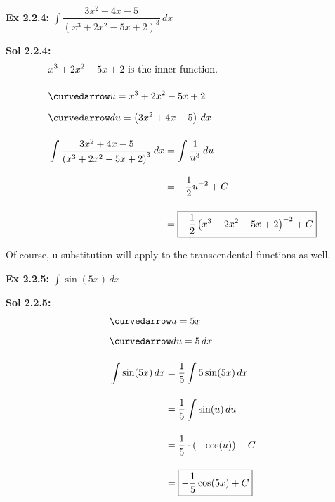 \begin{tcolorbox}[example]
    \textbf{Ex 2.2.4: } $\int \dfrac{3x^2 + 4x - 5}{\left(x^3 + 2x^2 - 5x + 2\right)^3} \, dx$
\end{tcolorbox}
\begin{tcolorbox}[solution]
    \textbf{Sol 2.2.4: } \begin{align*}
        & x^3 + 2x^2 - 5x + 2 \text{ is the inner function.} \\[11pt]
        & \curvedarrow u = x^3 + 2x^2 - 5x + 2 \\[5.5pt]
        & \curvedarrow du = \left(3x^2 + 4x - 5\right) \, dx \\[11pt]
        & \int \dfrac{3x^2 + 4x - 5}{\left(x^3 + 2x^2 - 5x + 2\right)^3} \, dx \begin{aligned}[t]
            & = \int \dfrac{1}{u^3} \, du \\[11pt]
            & = -\dfrac{1}{2}u^{-2} + C \\[11pt]
            & = \boxed{-\dfrac{1}{2}\left(x^3 + 2x^2 - 5x + 2\right)^{-2} + C}
        \end{aligned} 
    \end{align*}
\end{tcolorbox}

Of course, u-substitution will apply to the transcendental functions as well. \par

\begin{tcolorbox}[example]
    \textbf{Ex 2.2.5: } $\int \sin (5x) \, dx$
\end{tcolorbox}
\begin{tcolorbox}[solution]
    \textbf{Sol 2.2.5: } \begin{align*}
        & \curvedarrow u = 5x \\[5.5pt]
        & \curvedarrow du = 5 \, dx \\[11pt]
        & \int \sin (5x) \, dx \begin{aligned}[t]
            & = \dfrac{1}{5}\int 5\sin (5x) \, dx \\[11pt]
            & = \dfrac{1}{5}\int \sin (u) \, du \\[11pt]
            & = \dfrac{1}{5} \cdot (-\cos (u)) + C \\[11pt]
            & = \boxed{-\dfrac{1}{5}\cos (5x) + C}
        \end{aligned}
    \end{align*}
\end{tcolorbox} \vspace{11pt}

